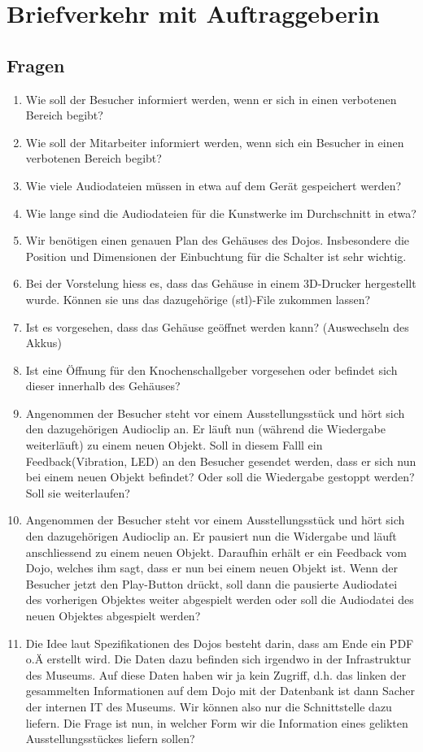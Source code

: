 \section{Briefverkehr mit Auftraggeberin}

\subsection*{Fragen}
\begin{enumerate} 
\item Wie soll der Besucher informiert werden, wenn er sich in einen verbotenen Bereich begibt?
\item Wie soll der Mitarbeiter informiert werden, wenn sich ein Besucher in einen verbotenen Bereich begibt?
\item Wie viele Audiodateien müssen in etwa auf dem Gerät gespeichert werden?
\item Wie lange sind die Audiodateien für die Kunstwerke im Durchschnitt in etwa?
\item Wir benötigen einen genauen Plan des Gehäuses des Dojos. Insbesondere die Position und Dimensionen der Einbuchtung für die Schalter ist sehr wichtig.
\item Bei der Vorstelung hiess es, dass das Gehäuse in einem 3D-Drucker hergestellt wurde. Können sie uns das dazugehörige (stl)-File zukommen lassen?
\item Ist es vorgesehen, dass das Gehäuse geöffnet werden kann? (Auswechseln des Akkus)
\item Ist eine Öffnung für den Knochenschallgeber vorgesehen oder befindet sich dieser innerhalb des Gehäuses?
\item Angenommen der Besucher steht vor einem Ausstellungsstück und hört sich den dazugehörigen Audioclip an. Er läuft nun (während die Wiedergabe weiterläuft) zu einem neuen Objekt. Soll in diesem Falll ein Feedback(Vibration, LED) an den Besucher gesendet werden, dass er sich nun bei einem neuen Objekt befindet? Oder soll die Wiedergabe gestoppt werden? Soll sie weiterlaufen?
\item Angenommen der Besucher steht vor einem Ausstellungsstück und hört sich den dazugehörigen Audioclip an. Er pausiert nun die Widergabe und läuft anschliessend zu einem neuen Objekt. Daraufhin erhält er ein Feedback vom Dojo, welches ihm sagt, dass er nun bei einem neuen Objekt ist. Wenn der Besucher jetzt den Play-Button drückt, soll dann die pausierte Audiodatei des vorherigen Objektes weiter abgespielt werden oder soll die Audiodatei des neuen Objektes abgespielt werden?
\item Die Idee laut Spezifikationen des Dojos besteht darin, dass am Ende ein PDF o.Ä erstellt wird. Die Daten dazu befinden sich irgendwo in der Infrastruktur des Museums. Auf diese Daten haben wir ja kein Zugriff, d.h. das linken der gesammelten Informationen auf dem Dojo mit der Datenbank ist dann Sacher der internen IT des Museums. Wir können also nur die Schnittstelle dazu liefern. Die Frage ist nun, in welcher Form wir die Information eines gelikten Ausstellungsstückes liefern sollen?
\end{enumerate}

